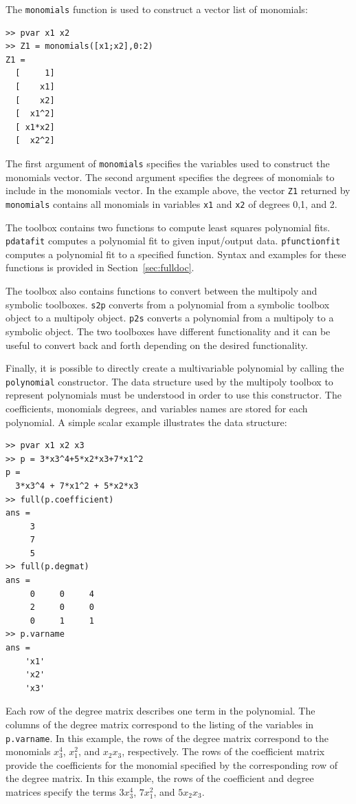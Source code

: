 \documentclass{article}
\begin{document}
The \texttt{monomials} function is used to construct a
vector list of monomials:
\begin{verbatim}
>> pvar x1 x2
>> Z1 = monomials([x1;x2],0:2)
Z1 =
  [     1]
  [    x1]
  [    x2]
  [  x1^2]
  [ x1*x2]
  [  x2^2]

\end{verbatim}
The first argument of \texttt{monomials} specifies the variables used
to construct the monomials vector.  The second argument specifies the
degrees of monomials to include in the monomials vector. In the
example above, the vector \texttt{Z1} returned by \texttt{monomials}
contains all monomials in variables \texttt{x1} and \texttt{x2} of
degrees 0,1, and 2.

The toolbox contains two functions to compute least squares
polynomial fits. \texttt{pdatafit} computes a polynomial fit to given
input/output data. \texttt{pfunctionfit} computes a polynomial
fit to a specified function. Syntax and examples for these functions
is provided in Section~\ref{sec:fulldoc}.

The toolbox also contains functions to convert between the multipoly
and symbolic toolboxes.  \texttt{s2p} converts from a polynomial from
a symbolic toolbox object to a multipoly object.  \texttt{p2s}
converts a polynomial from a multipoly to a symbolic object. The
two toolboxes have different functionality and it can be useful
to convert back and forth depending on the desired functionality.

Finally, it is possible to directly create a multivariable polynomial
by calling the \texttt{polynomial} constructor.  The data structure
used by the multipoly toolbox to represent polynomials must be
understood in order to use this constructor.  The coefficients,
monomials degrees, and variables names are stored for each polynomial.
A simple scalar example illustrates the data structure:

\begin{verbatim}
>> pvar x1 x2 x3
>> p = 3*x3^4+5*x2*x3+7*x1^2
p =
  3*x3^4 + 7*x1^2 + 5*x2*x3
>> full(p.coefficient)
ans =
     3
     7
     5
>> full(p.degmat)
ans =
     0     0     4
     2     0     0
     0     1     1
>> p.varname
ans =
    'x1'
    'x2'
    'x3'

\end{verbatim}

Each row of the degree matrix describes one term in the polynomial.
The columns of the degree matrix correspond to the listing of the
variables in \texttt{p.varname}.  In this example, the rows of the
degree matrix correspond to the monomials $x_3^4$, $x_1^2$, and
$x_2x_3$, respectively.  The rows of the coefficient matrix provide
the coefficients for the monomial specified by the corresponding row
of the degree matrix.  In this example, the rows of the coefficient
and degree matrices specify the terms $3x_3^4$, $7x_1^2$, and
$5x_2x_3$.
\end{document}
